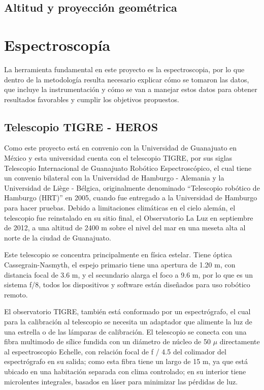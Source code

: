 \documentclass[12pt,oneside,openany,letter]{book}
\begin{document}
\subsection{Altitud y proyección geométrica}

\section{Espectroscopía} 
La herramienta fundamental en este proyecto es la espectroscopia, por lo que dentro de la metodología resulta necesario explicar cómo se tomaron las datos, que incluye la instrumentación y cómo se van a manejar estos datos para obtener resultados favorables y cumplir los objetivos propuestos.

\subsection{Telescopio TIGRE - HEROS}

Como este proyecto está en convenio con la Universidad de Guanajuato en México y esta universidad cuenta con el telescopio TIGRE, por sus siglas Telescopio Internacional de Guanajuato Robótico Espectroscópico, el cual tiene un convenio bilateral con la Universidad de Hamburgo - Alemania y la Universidad de Liège - Bélgica, originalmente denominado ``Telescopio robótico de Hamburgo (HRT)'' en 2005, cuando fue entregado a la Universidad de Hamburgo para hacer pruebas.  Debido a limitaciones climáticas en el cielo alemán, el telescopio fue reinstalado en su sitio final, el Observatorio La Luz en septiembre de 2012, a una altitud de 2400 m sobre el nivel del mar en una meseta alta al norte de la ciudad de Guanajuato.

\noindent Este telescopio se concentra principalmente en física estelar. Tiene óptica Cassegrain-Nasmyth, el espejo primario tiene una apertura de 1.20 m, con distancia focal de 3.6 m, y el secundario alarga el foco a 9.6 m, por lo que es un sistema f/8, todos los dispositivos y software están diseñados para uso robótico remoto.

\noindent El observatorio TIGRE, también está conformado por un espectrógrafo, el cual para la calibración al telescopio se necesita un adaptador que alimente la luz de una estrella o de las lámparas de calibración. El telescopio se conecta con una fibra multimodo de sílice fundida con un diámetro de núcleo de 50 $\mu $ directamente al espectroscopio Echelle, con relación focal de f / 4.5 del colimador del espectrógrafo en su salida; como esta fibra tiene un largo de 15 m, ya que está ubicado en una habitación separada con clima controlado;  en su interior tiene microlentes integrales, basados en láser para minimizar las pérdidas de luz.
\end{document}
